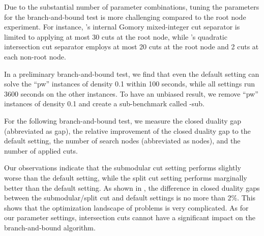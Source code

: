 Due to the substantial number of parameter combinations, tuning the parameters for the branch-and-bound test is more challenging compared to the root node experiment. For instance, \scip's internal Gomory mixed-integer cut separator \cite{BibEntry2023Jul2,cornuejols2013safety} is limited to applying at most 30 cuts at the root node, while \scip's quadratic intersection cut separator \cite{BibEntry2023Jul3,chmiela2022implementation} employs at most 20 cuts at the root node and 2 cuts at each non-root node.


In a preliminary branch-and-bound test, we find  that even the default setting can solve the ``pw'' instances of density 0.1 within 100 seconds, while all settings run 3600  seconds on the other instances. To have an unbiased result, we remove ``pw'' instances of density 0.1 and create a sub-benchmark called \maxcut-sub.


For the following branch-and-bound test, we measure the closed duality gap (abbreviated as gap), the relative improvement of the closed duality gap to the default setting, the number of search nodes (abbreviated as nodes), and the number of applied cuts.

\begin{table} [htbp]
\centering
{}
\caption{Summary of \maxcut-sub results in the embedded branch-and-bound test}\label{Aalpha}
\end{table}

Our observations indicate that the submodular cut setting performs slightly worse than the default setting, while the split cut setting performs marginally better than the default setting. As shown in , the difference in closed duality gaps between the submodular/split cut and default settings is no more than 2\%.
This shows that the optimization landscape of \maxcut problems is very complicated. As for our parameter settings, intersection cuts cannot have a significant impact on the branch-and-bound algorithm.




